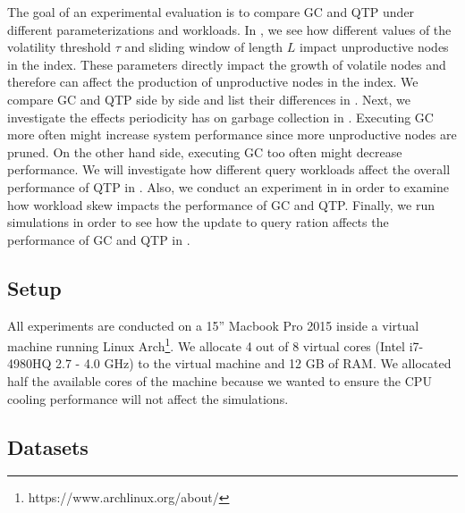 \documentclass[abstracton,12pt]{scrartcl}
\theoremstyle{definition}
\begin{document}
The goal of an experimental evaluation is to compare GC and QTP under
different parameterizations and workloads.
In , we see how different values of the
volatility threshold $\tau$
and sliding window of length $L$ impact unproductive nodes in the index. These
parameters directly impact the growth of volatile nodes and therefore can affect
the production of unproductive nodes in the index. We compare GC and QTP side by
side and list their differences in . Next, we
investigate the effects periodicity has on garbage collection in .
Executing GC more often might increase system
performance since more unproductive nodes are pruned. On the other hand side,
executing GC too often might decrease performance. We will investigate how
different query workloads affect the overall
performance of QTP in . Also, we conduct an
experiment in  in order to examine how
workload skew impacts the performance of GC and QTP. Finally, we run simulations
in order to see how the update to query ration affects the performance of GC and
QTP in .

\subsection{Setup}

All experiments are conducted on a 15'' Macbook Pro 2015 inside
a virtual machine running Linux Arch\footnote{https://www.archlinux.org/about/}.
We allocate 4 out of 8 virtual cores (Intel i7-4980HQ 2.7 - 4.0 GHz) to the virtual
machine and 12 GB of RAM. We allocated half the available cores of the machine
because we wanted to ensure the CPU cooling performance will not affect the simulations.



\subsection{Datasets}
\end{document}
